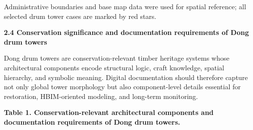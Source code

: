 Administrative boundaries and base map data were used for spatial
reference; all selected drum tower cases are marked by red stars.

\textbf{2.4 Conservation significance and documentation requirements
of Dong drum towers}

Dong drum towers are conservation-relevant timber heritage systems
whose architectural components encode structural logic, craft knowledge,
spatial hierarchy, and symbolic meaning. Digital documentation should
therefore capture not only global tower morphology but also
component-level details essential for restoration, HBIM-oriented
modeling, and long-term monitoring.

\textbf{Table 1. Conservation-relevant architectural components and
documentation requirements of Dong drum towers.}

